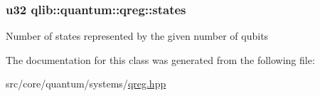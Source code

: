 \subsubsection[{\texorpdfstring{states}{states}}]{\setlength{\rightskip}{0pt plus 5cm}u32 qlib\+::quantum\+::qreg\+::states\hspace{0.3cm}{\ttfamily [private]}}\hypertarget{classqlib_1_1quantum_1_1qreg_ad0e84b959f93f3da6ed81eb096f809d1}{}\label{classqlib_1_1quantum_1_1qreg_ad0e84b959f93f3da6ed81eb096f809d1}
Number of states represented by the given number of qubits 

The documentation for this class was generated from the following file\+:\begin{DoxyCompactItemize}
\item 
src/core/quantum/systems/\hyperlink{qreg_8hpp}{qreg.\+hpp}\end{DoxyCompactItemize}
